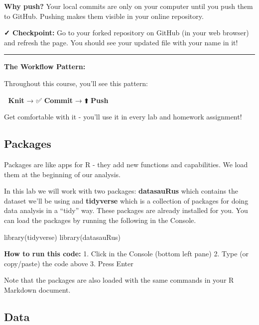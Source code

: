 \documentclass[]{tufte-handout}
\newenvironment{Shaded}{}{}
\newcommand{\FunctionTok}[1]{\textcolor[rgb]{0.02,0.16,0.49}{#1}}
\newcommand{\NormalTok}[1]{#1}
\begin{document}
\textbf{Why push?} Your local commits are only on your computer until
you push them to GitHub. Pushing makes them visible in your online
repository.

\textbf{✓ Checkpoint:} Go to your forked repository on GitHub (in your
web browser) and refresh the page. You should see your updated file with
your name in it!

\begin{center}\rule{0.5\linewidth}{0.5pt}\end{center}

\textbf{The Workflow Pattern:}

Throughout this course, you'll see this pattern:

🧶 \textbf{Knit} → ✅ \textbf{Commit} → ⬆️ \textbf{Push}

Get comfortable with it - you'll use it in every lab and homework
assignment!

\subsection{Packages}\label{packages}

\begin{marginfigure}
Packages are like apps for R - they add new functions and capabilities.
We load them at the beginning of our analysis.
\end{marginfigure}

In this lab we will work with two packages: \textbf{datasauRus} which
contains the dataset we'll be using and \textbf{tidyverse} which is a
collection of packages for doing data analysis in a ``tidy'' way. These
packages are already installed for you. You can load the packages by
running the following in the Console.

\begin{Shaded}
\begin{Highlighting}[]
\FunctionTok{library}\NormalTok{(tidyverse) }
\FunctionTok{library}\NormalTok{(datasauRus)}
\end{Highlighting}
\end{Shaded}

\textbf{How to run this code:} 1. Click in the Console (bottom left
pane) 2. Type (or copy/paste) the code above 3. Press Enter

Note that the packages are also loaded with the same commands in your R
Markdown document.

\subsection{Data}\label{data}
\end{document}
